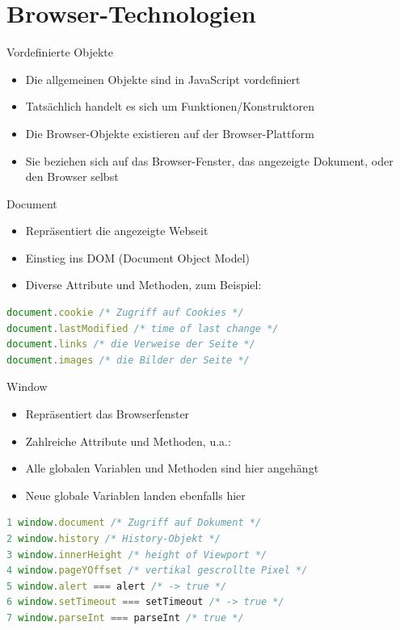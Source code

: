 \section{Browser-Technologien}
\begin{definition}{Vordefinierte Objekte}
\begin{itemize}
  \item Die allgemeinen Objekte sind in JavaScript vordefiniert
  \item Tatsächlich handelt es sich um Funktionen/Konstruktoren
  \item Die Browser-Objekte existieren auf der Browser-Plattform
  \item Sie beziehen sich auf das Browser-Fenster, das angezeigte Dokument, oder den Browser selbst
\end{itemize}
\end{definition}

\begin{definition}{Document}
\begin{itemize}
  \item Repräsentiert die angezeigte Webseit
  \item Einstieg ins DOM (Document Object Model)
  \item Diverse Attribute und Methoden, zum Beispiel:
\end{itemize}
\begin{lstlisting}[language=JavaScript, style=basesmol]
document.cookie /* Zugriff auf Cookies */
document.lastModified /* time of last change */
document.links /* die Verweise der Seite */
document.images /* die Bilder der Seite */
\end{lstlisting}
\end{definition}



\begin{definition}{Window}
\begin{itemize}
  \item Repräsentiert das Browserfenster
  \item Zahlreiche Attribute und Methoden, u.a.:
  \item Alle globalen Variablen und Methoden sind hier angehängt
  \item Neue globale Variablen landen ebenfalls hier
\end{itemize}
\end{definition}

\begin{lstlisting}[language=JavaScript, style=basesmol]
1 window.document /* Zugriff auf Dokument */
2 window.history /* History-Objekt */
3 window.innerHeight /* height of Viewport */
4 window.pageYOffset /* vertikal gescrollte Pixel */
5 window.alert === alert /* -> true */
6 window.setTimeout === setTimeout /* -> true */
7 window.parseInt === parseInt /* true */
\end{lstlisting}

